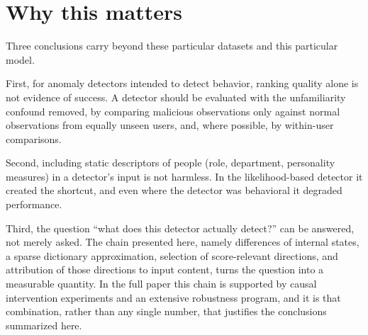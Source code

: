 \documentclass[10pt]{article}
\begin{document}
\section{Why this matters}

Three conclusions carry beyond these particular datasets and this
particular model.

First, for anomaly detectors intended to detect behavior, ranking
quality alone is not evidence of success. A detector should be evaluated
with the unfamiliarity confound removed, by comparing malicious
observations only against normal observations from equally unseen
users, and, where possible, by within-user comparisons.

Second, including static descriptors of people (role, department,
personality measures) in a detector's input is not harmless. In the
likelihood-based detector it created the shortcut, and even where the
detector was behavioral it degraded performance.

Third, the question ``what does this detector actually detect?'' can be
answered, not merely asked. The chain presented here, namely
differences of internal states, a sparse dictionary approximation,
selection of score-relevant directions, and attribution of those
directions to input content, turns the question into a measurable
quantity. In the full paper this chain is supported by causal
intervention experiments and an extensive robustness program, and it is
that combination, rather than any single number, that justifies the
conclusions summarized here.
\end{document}
